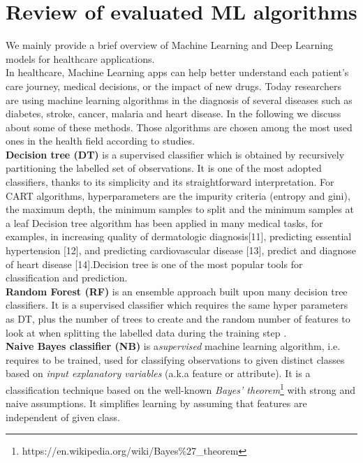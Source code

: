 \section{Review of evaluated ML algorithms}\label{ml_algorithms}

We mainly provide a brief overview of Machine Learning and Deep Learning models for healthcare applications. \\

In healthcare, Machine Learning apps can help better understand each patient's care journey, medical decisions, or the impact of new drugs. Today researchers are using machine learning algorithms in the diagnosis of several diseases such as diabetes, stroke, cancer, malaria and heart disease. In the following we discuss about some of these methods.  Those algorithms are chosen among the most used ones in the health field according to studies\cite{de2018binary,tomar2013survey}.\\
\textbf{Decision tree (DT)}\cite{Ro05} is a supervised classifier which is obtained by recursively partitioning the labelled set of observations. It is one of the most adopted classifiers, thanks to its simplicity and its straightforward interpretation. For CART algorithms, hyperparameters are the impurity criteria (entropy and gini), the maximum depth, the minimum samples to split and the minimum samples at a leaf
Decision tree algorithm has been applied in many medical tasks, for examples, in increasing quality of dermatologic diagnosis[11], predicting essential hypertension [12], and predicting cardiovascular disease [13], predict and diagnose of heart disease [14].Decision tree is one of the most popular tools for classification and prediction.\\
\textbf{Random Forest (RF)}\cite{Be01} is an ensemble approach built upon many decision tree classifiers. It is a supervised classifier which requires the same hyper parameters as DT, plus the number of trees to create and the random number of features to look at when splitting the labelled data during the training step \cite{Be01}.\\
\textbf{ Naive Bayes classifier (NB) }\cite{Ka17} is a\emph{supervised} machine learning algorithm, i.e. requires to be trained, used for classifying observations to given distinct classes based on \emph{input explanatory variables} (a.k.a feature or attribute).
It is a classification technique based on the well-known \emph{Bayes’ theorem}\footnote{https://en.wikipedia.org/wiki/Bayes\%27\_theorem} with strong and naive assumptions. It simplifies learning by assuming that features are independent of given class.
